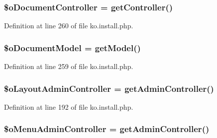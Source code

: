 \subsubsection[{\texorpdfstring{\$o\+Document\+Controller}{$oDocumentController}}]{\setlength{\rightskip}{0pt plus 5cm}\$o\+Document\+Controller = {\bf get\+Controller}(\textquotesingle{})}\hypertarget{ko_8install_8php_aac43fce682d4b7a05df6d3e44c2c54e6}{}\label{ko_8install_8php_aac43fce682d4b7a05df6d3e44c2c54e6}


Definition at line 260 of file ko.\+install.\+php.

\subsubsection[{\texorpdfstring{\$o\+Document\+Model}{$oDocumentModel}}]{\setlength{\rightskip}{0pt plus 5cm}\$o\+Document\+Model = {\bf get\+Model}(\textquotesingle{})}\hypertarget{ko_8install_8php_afb18aa87e5520385e76377e876e042af}{}\label{ko_8install_8php_afb18aa87e5520385e76377e876e042af}


Definition at line 259 of file ko.\+install.\+php.

\subsubsection[{\texorpdfstring{\$o\+Layout\+Admin\+Controller}{$oLayoutAdminController}}]{\setlength{\rightskip}{0pt plus 5cm}\$o\+Layout\+Admin\+Controller = {\bf get\+Admin\+Controller}(\textquotesingle{})}\hypertarget{ko_8install_8php_a6a03496003da7df71cf94d9accb430be}{}\label{ko_8install_8php_a6a03496003da7df71cf94d9accb430be}


Definition at line 192 of file ko.\+install.\+php.

\subsubsection[{\texorpdfstring{\$o\+Menu\+Admin\+Controller}{$oMenuAdminController}}]{\setlength{\rightskip}{0pt plus 5cm}\$o\+Menu\+Admin\+Controller = {\bf get\+Admin\+Controller}(\textquotesingle{})}\hypertarget{ko_8install_8php_a9062530c3b03479ca4530daee1c18887}{}\label{ko_8install_8php_a9062530c3b03479ca4530daee1c18887}


